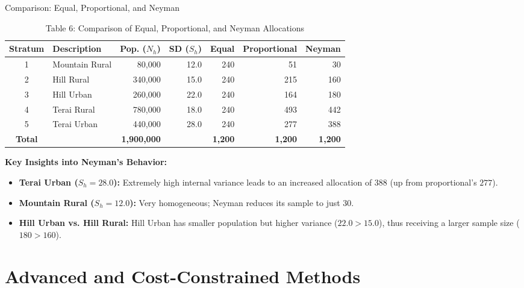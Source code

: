 \documentclass[10pt, aspectratio=169]{beamer}
\begin{document}
  \begin{frame}{Comparison: Equal, Proportional, and Neyman}
      \begin{table}
          \caption{Table 6: Comparison of Equal, Proportional, and Neyman Allocations}
          \footnotesize
          \begin{tabularx}{\textwidth}{clrrrrr}
              \toprule
              \textbf{Stratum} & \textbf{Description} & \textbf{Pop. ($N_h$)} & \textbf{SD ($S_h$)} & \textbf{Equal} & \textbf{Proportional} & \textbf{Neyman} \\
              \midrule
              1 & Mountain Rural & 80,000 & 12.0 & 240 & 51 & 30 \\
              2 & Hill Rural & 340,000 & 15.0 & 240 & 215 & 160 \\
              3 & Hill Urban & 260,000 & 22.0 & 240 & 164 & 180 \\
              4 & Terai Rural & 780,000 & 18.0 & 240 & 493 & 442 \\
              5 & Terai Urban & 440,000 & 28.0 & 240 & 277 & 388 \\
              \midrule
              \textbf{Total} & & \textbf{1,900,000} & & \textbf{1,200} & \textbf{1,200} & \textbf{1,200} \\
              \bottomrule
          \end{tabularx}
      \end{table}
      
      \textbf{Key Insights into Neyman's Behavior:}
      \begin{itemize}
          \item \textbf{Terai Urban ($S_h = 28.0$):} Extremely high internal variance leads to an increased allocation of $388$ (up from proportional's $277$).
          \item \textbf{Mountain Rural ($S_h = 12.0$):} Very homogeneous; Neyman reduces its sample to just $30$.
          \item \textbf{Hill Urban vs. Hill Rural:} Hill Urban has smaller population but higher variance ($22.0 > 15.0$), thus receiving a larger sample size ($180 > 160$).
      \end{itemize}
  \end{frame}
  
  \section{Advanced and Cost-Constrained Methods}
  
\end{document}
